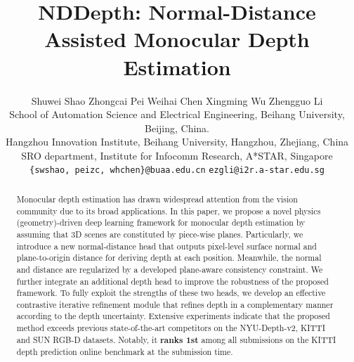 \documentclass[10pt,twocolumn,letterpaper]{article}
\begin{document}
\title{NDDepth: Normal-Distance Assisted Monocular Depth Estimation}

\author{Shuwei Shao\hspace{0.3in} 
	Zhongcai Pei\hspace{0.3in} 
	Weihai Chen\footnotemark[1]\hspace{0.3in}
	Xingming Wu\hspace{0.3in}
	Zhengguo Li\hspace{0.3in}\\
	{School of Automation Science and Electrical Engineering, Beihang University, Beijing, China.}\\
	{Hangzhou Innovation Institute, Beihang University, Hangzhou, Zhejiang, China}\\
	 {SRO department, Institute for Infocomm Research, A*STAR, Singapore} \\
	{\tt\small \{swshao, peizc, whchen\}@buaa.edu.cn}\hspace{0.3in}
	{\tt\small ezgli@i2r.a-star.edu.sg}\\
\vspace{-2mm}
}

\maketitle
\ificcvfinal\thispagestyle{empty}\fi
\renewcommand{\thefootnote}{\fnsymbol{footnote}} 
\begin{abstract}
	Monocular depth estimation has drawn widespread attention from the vision community due to its broad applications. In this paper, we propose a novel physics (geometry)-driven deep learning framework for monocular depth estimation by assuming that 3D scenes are constituted by piece-wise planes. Particularly, we introduce a new normal-distance head that outputs pixel-level surface normal and plane-to-origin distance for deriving depth at each position. Meanwhile, the normal and distance are regularized by a developed plane-aware consistency constraint. We further integrate an additional depth head to improve the robustness of the proposed framework. To fully exploit the strengths of these two heads, we develop an effective contrastive iterative refinement module that refines depth in a complementary manner according to the depth uncertainty. Extensive experiments indicate that the proposed method exceeds previous state-of-the-art competitors on the NYU-Depth-v2, KITTI and SUN RGB-D datasets. Notably, it \textbf{ranks 1st} among all submissions on the KITTI depth prediction online benchmark at the submission time. 
\end{abstract}
\end{document}
